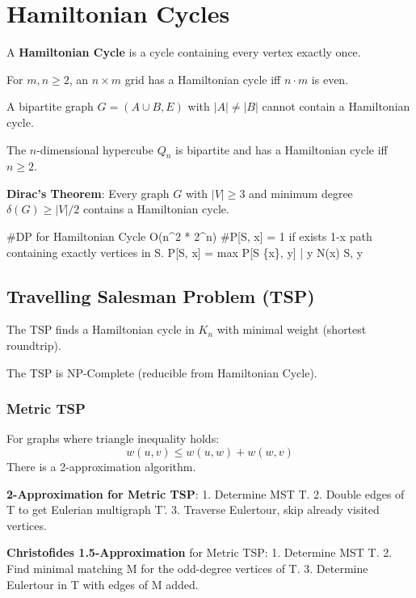\section{Hamiltonian Cycles}

\begin{definition}
A \textbf{Hamiltonian Cycle} is a cycle containing every vertex exactly once.
\end{definition}

\begin{theorem}
For $m, n \ge 2$, an $n \times m$ grid has a Hamiltonian cycle iff $n \cdot m$ is even.
\end{theorem}

\begin{theorem}
A bipartite graph $G = (A \cup B, E)$ with $|A| \neq |B|$ cannot contain a Hamiltonian cycle.
\end{theorem}

\begin{example}
The $n$-dimensional hypercube $Q_n$ is bipartite and has a Hamiltonian cycle iff $n \ge 2$.
\end{example}

\begin{theorem}
\textbf{Dirac's Theorem}: Every graph $G$ with $|V| \ge 3$ and minimum degree $\delta(G) \ge |V|/2$ contains a Hamiltonian cycle.
\end{theorem}

\begin{algorithm}
#DP for Hamiltonian Cycle O(n^2 * 2^n)
#P[S, x] = 1 if exists 1-x path containing exactly vertices in S.
P[S, x] = max { P[S \setminus \{x\}, y] | y \in N(x) \cap S, y  }
\end{algorithm}

\subsection{Travelling Salesman Problem (TSP)}

The TSP finds a Hamiltonian cycle in $K_n$ with minimal weight (shortest roundtrip).

\begin{theorem}
The TSP is NP-Complete (reducible from Hamiltonian Cycle).
\end{theorem}

\subsubsection{Metric TSP}
For graphs where triangle inequality holds:
$$w(u,v) \le w(u,w) + w(w,v)$$
There is a 2-approximation algorithm.

\begin{algorithm}
\textbf{2-Approximation for Metric TSP}: 1. Determine MST T. 2. Double edges of T to get Eulerian multigraph T'. 3. Traverse Eulertour, skip already visited vertices.
\end{algorithm}

\begin{theorem}
\textbf{Christofides 1.5-Approximation} for Metric TSP:
1. Determine MST T.
2. Find minimal matching M for the odd-degree vertices of T.
3. Determine Eulertour in T with edges of M added.
\end{theorem}
